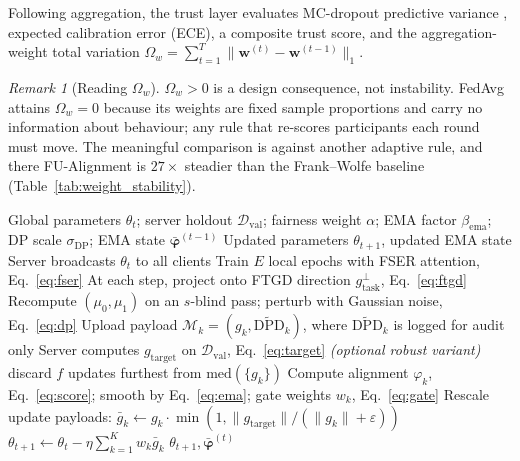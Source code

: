 \documentclass[preprint,12pt]{elsarticle}
\theoremstyle{plain}
\theoremstyle{definition}
\theoremstyle{remark}
\newtheorem{remark}{Remark}
\newcommand{\dpd}{\mathrm{DPD}}
\begin{document}
Following aggregation, the trust layer evaluates MC-dropout predictive variance \cite{gal2016dropout}, expected calibration error (ECE), a composite trust score, and the aggregation-weight total variation $\Omega_w = \sum_{t=1}^T \lVert \bm{w}^{(t)} - \bm{w}^{(t-1)}\rVert_1$.

\begin{remark}[Reading $\Omega_w$]
$\Omega_w > 0$ is a design consequence, not instability. FedAvg attains $\Omega_w = 0$ because its weights are fixed sample proportions and carry no information about behaviour; any rule that re-scores participants each round must move. The meaningful comparison is against another adaptive rule, and there FU-Alignment is $27\times$ steadier than the Frank--Wolfe baseline (Table~\ref{tab:weight_stability}).
\end{remark}

\begin{algorithm}[t]
\caption{TrustFedGNN: one communication round}
\label{alg:trustfedgnn}
\begin{algorithmic}[1]
\REQUIRE Global parameters $\theta_t$; server holdout $\mathcal{D}_{\mathrm{val}}$; fairness weight $\alpha$; EMA factor $\beta_{\mathrm{ema}}$; DP scale $\sigma_{\mathrm{DP}}$; EMA state $\bar{\bm{\varphi}}^{(t-1)}$
\ENSURE Updated parameters $\theta_{t+1}$, updated EMA state
\STATE Server broadcasts $\theta_t$ to all clients 
    \STATE Train $E$ local epochs with FSER attention, Eq.~\eqref{eq:fser} 
    \STATE At each step, project onto FTGD direction $g^{\perp}_{\mathrm{task}}$, Eq.~\eqref{eq:ftgd} 
    \STATE Recompute $(\mu_0,\mu_1)$ on an $s$-blind pass; perturb with Gaussian noise, Eq.~\eqref{eq:dp} 
    \STATE Upload payload $\mathcal{M}_k = (g_k, \widetilde{\dpd}_k)$, where $\widetilde{\dpd}_k$ is logged for audit only
\ENDFOR
\STATE Server computes $g_{\mathrm{target}}$ on $\mathcal{D}_{\mathrm{val}}$, Eq.~\eqref{eq:target} 
\STATE \textit{(optional robust variant)} discard $f$ updates furthest from $\mathrm{med}(\{g_k\})$
\STATE Compute alignment $\varphi_k$, Eq.~\eqref{eq:score}; smooth by Eq.~\eqref{eq:ema}; gate weights $w_k$, Eq.~\eqref{eq:gate}
\STATE Rescale update payloads: $\bar{g}_k \leftarrow g_k \cdot \min(1, \lVert g_{\mathrm{target}}\rVert / (\lVert g_k\rVert + \varepsilon))$ 
\STATE $\theta_{t+1} \leftarrow \theta_t - \eta \sum_{k=1}^K w_k \bar{g}_k$ 
\RETURN $\theta_{t+1}, \bar{\bm{\varphi}}^{(t)}$
\end{algorithmic}
\end{algorithm}
\end{document}
